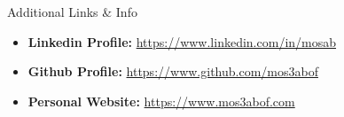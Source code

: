 \documentclass[]{mosabcv}
\begin{document}
    \begin{cvsection}{Additional Links \& Info}
        \begin{cvsubsection}{}{}{}
            \begin{itemize}
                \item \textbf{Linkedin Profile:} \href{https://www.linkedin.com/in/mosab}{https://www.linkedin.com/in/mosab}
                \item \textbf{Github Profile:} \href{https://www.github.com/mos3abof}{https://www.github.com/mos3abof}
                \item \textbf{Personal Website:} \href{https://www.mos3abof.com}{https://www.mos3abof.com}
            \end{itemize}
        \end{cvsubsection}
    \end{cvsection}
\end{document}
